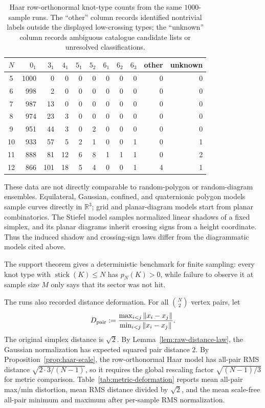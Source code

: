 \documentclass[11pt]{amsart}
\theoremstyle{remark}
\newcommand{\Rbb}{\mathbb{R}}
\newcommand{\1}{\mathbf{1}}
\begin{document}
\begin{table}[ht]
\centering
\scriptsize
\begin{tabular}{c|rrrrrrrrrr}
\(N\) & \(0_1\) & \(3_1\) & \(4_1\) & \(5_1\) & \(5_2\) & \(6_1\) & \(6_2\) & \(6_3\)
& other & unknown\\
\hline
5  & 1000 & 0   & 0  & 0 & 0 & 0 & 0 & 0 & 0 & 0\\
6  & 998  & 2   & 0  & 0 & 0 & 0 & 0 & 0 & 0 & 0\\
7  & 987  & 13  & 0  & 0 & 0 & 0 & 0 & 0 & 0 & 0\\
8  & 974  & 23  & 3  & 0 & 0 & 0 & 0 & 0 & 0 & 0\\
9  & 951  & 44  & 3  & 0 & 2 & 0 & 0 & 0 & 0 & 0\\
10 & 933  & 57  & 5  & 2 & 1 & 0 & 0 & 1 & 0 & 1\\
11 & 888  & 81  & 12 & 6 & 8 & 1 & 1 & 1 & 0 & 2\\
12 & 866  & 101 & 18 & 5 & 4 & 0 & 0 & 1 & 4 & 1
\end{tabular}
\caption{Haar row-orthonormal knot-type counts from the same \(1000\)-sample runs.  The
``other'' column records identified nontrivial labels outside the displayed
low-crossing types; the ``unknown'' column records ambiguous catalogue candidate lists or
unresolved classifications.}
\label{tab:haar-type-counts}
\end{table}

These data are not directly comparable to random-polygon or random-diagram ensembles.
Equilateral, Gaussian, confined, and quaternionic polygon models sample curves directly in
\(\Rbb^3\); grid and planar-diagram models start from planar combinatorics.  The Stiefel
model samples normalized linear shadows of a fixed simplex, and its planar diagrams inherit
crossing signs from a height coordinate.  Thus the induced shadow and crossing-sign laws
differ from the diagrammatic models cited above.

The support theorem gives a deterministic benchmark for finite sampling: every knot type
with \(\operatorname{stick}(K)\le N\) has \(p_N(K)>0\), while failure to observe it at
sample size \(M\) only says that its sector was not hit.

The runs also recorded distance deformation.  For all \(\binom N2\) vertex pairs, let
\[
D_{\rm pair}:=\frac{\max_{i<j}\|x_i-x_j\|}{\min_{i<j}\|x_i-x_j\|}.
\]
The original simplex distance is \(\sqrt2\).  By Lemma~\ref{lem:raw-distance-law}, the Gaussian normalization has expected squared pair distance \(2\).  By
Proposition~\ref{prop:haar-scale}, the row-orthonormal Haar model has all-pair RMS distance
\(\sqrt{2\cdot 3/(N-1)}\), so it requires the global rescaling factor
\(\sqrt{(N-1)/3}\) for metric comparison.  Table~\ref{tab:metric-deformation} reports mean
all-pair max/min distortion, mean RMS distance divided by \(\sqrt2\), and the mean
scale-free all-pair minimum and maximum after per-sample RMS normalization.
\end{document}
